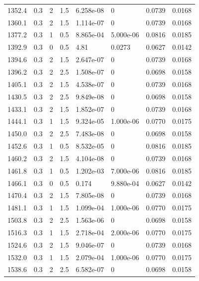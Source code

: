 \documentclass[preview]{standalone}
\begin{document}
{{{\begin{tabular}{L{1.2cm}C{1.2cm} C{0.3cm}C{0.5cm} C{1.4cm}C{1.4cm} C{1.4cm}C{1.4cm}}
  1352.4  &   0.3  & 2     & 1.5 &  6.258e-08  & 0  & 0.0739 &  0.0168   \\ 
  1360.1  &   0.3  & 2     & 1.5 &  1.114e-07  & 0  & 0.0739 &  0.0168   \\ 
  1377.2  &   0.3  & 1     & 0.5 &  8.865e-04  & 5.000e-06  & 0.0816 &  0.0185   \\ 
  1392.9  &   0.3  & 0     & 0.5 &  4.81  & 0.0273  & 0.0627 &  0.0142   \\ 
  1394.6  &   0.3  & 2     & 1.5 &  2.647e-07  & 0  & 0.0739 &  0.0168   \\ 
  1396.2  &   0.3  & 2     & 2.5 &  1.508e-07  & 0  & 0.0698 &  0.0158   \\ 
  1405.1  &   0.3  & 2     & 1.5 &  4.538e-07  & 0  & 0.0739 &  0.0168   \\ 
  1430.5  &   0.3  & 2     & 2.5 &  9.849e-08  & 0  & 0.0698 &  0.0158   \\ 
  1433.1  &   0.3  & 2     & 1.5 &  1.852e-07  & 0  & 0.0739 &  0.0168   \\ 
  1444.1  &   0.3  & 1     & 1.5 &  9.324e-05  & 1.000e-06  & 0.0770 &  0.0175   \\ 
  1450.0  &   0.3  & 2     & 2.5 &  7.483e-08  & 0  & 0.0698 &  0.0158   \\ 
  1452.6  &   0.3  & 1     & 0.5 &  8.532e-05  & 0  & 0.0816 &  0.0185   \\ 
  1460.2  &   0.3  & 2     & 1.5 &  4.104e-08  & 0  & 0.0739 &  0.0168   \\ 
  1461.8  &   0.3  & 1     & 0.5 &  1.202e-03  & 7.000e-06  & 0.0816 &  0.0185   \\ 
  1466.1  &   0.3  & 0     & 0.5 &  0.174  & 9.880e-04  & 0.0627 &  0.0142   \\ 
  1470.4  &   0.3  & 2     & 1.5 &  7.805e-08  & 0  & 0.0739 &  0.0168   \\ 
  1481.1  &   0.3  & 1     & 1.5 &  1.099e-04  & 1.000e-06  & 0.0770 &  0.0175   \\ 
  1503.8  &   0.3  & 2     & 2.5 &  1.563e-06  & 0  & 0.0698 &  0.0158   \\ 
  1516.3  &   0.3  & 1     & 1.5 &  2.718e-04  & 2.000e-06  & 0.0770 &  0.0175   \\ 
  1524.6  &   0.3  & 2     & 1.5 &  9.046e-07  & 0  & 0.0739 &  0.0168   \\ 
  1532.0  &   0.3  & 1     & 1.5 &  2.079e-04  & 1.000e-06  & 0.0770 &  0.0175   \\ 
  1538.6  &   0.3  & 2     & 2.5 &  6.582e-07  & 0  & 0.0698 &  0.0158   \\ 

\end{tabular}}}}
\end{document}
